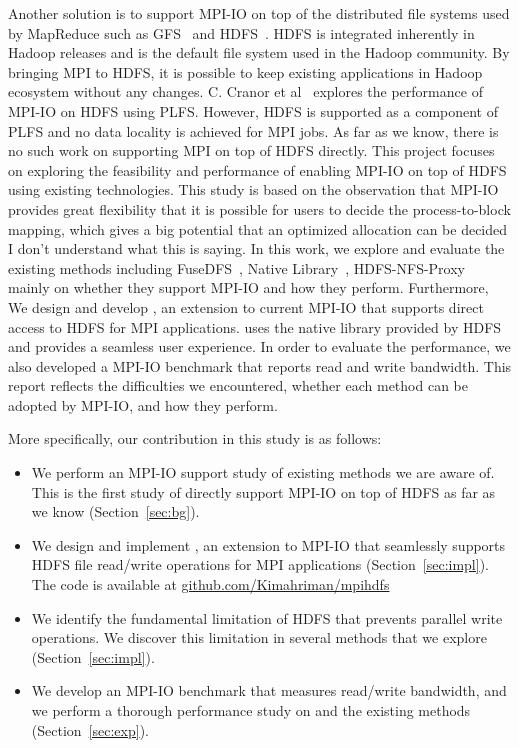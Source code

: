 Another solution is to support MPI-IO on top of the distributed file systems
used by MapReduce such as GFS~\cite{gfs} and HDFS~\cite{hdfs}. HDFS is integrated
inherently in Hadoop releases and is the default file system used in the Hadoop
community. By bringing MPI to HDFS, it is possible to keep existing applications
in Hadoop ecosystem without any changes. C. Cranor et al~\cite{CMU-PDL-12-115} explores the
performance of MPI-IO on HDFS using PLFS. However, HDFS is supported as a
component of PLFS and no data locality is achieved for MPI jobs. As far as we
know, there is no such work on supporting MPI on top of HDFS directly. This
project focuses on exploring the feasibility and performance of enabling MPI-IO
on top of HDFS using existing technologies. This study is based on the
observation that MPI-IO provides great flexibility that it is possible for users
to decide the process-to-block mapping, which gives a big potential that an
optimized allocation can be decided {\color{red} I don't understand what this is saying}. In this work, we explore and evaluate
the existing methods including FuseDFS~\cite{fuse}, Native Library~\cite{lib},
HDFS-NFS-Proxy~\cite{proxy} mainly on whether they support MPI-IO and how
they perform. Furthermore, We design and develop
{\proj}, an extension to current MPI-IO that supports direct access to HDFS for
MPI applications. {\proj} uses the native library provided by HDFS and provides a
seamless user experience. In order to evaluate the performance, we also
developed a MPI-IO benchmark that reports read and write bandwidth. This report
reflects the difficulties we encountered, whether each method can be adopted by
MPI-IO, and how they perform. 

More specifically, our contribution in this study is as follows:
\begin{itemize}
\item We perform an MPI-IO support study of existing methods we are aware of. This
	is the first study of directly support MPI-IO on top of HDFS as far as
	we know (Section~\ref{sec:bg}).
\item We design and implement {\proj}, an extension to MPI-IO that seamlessly
	supports HDFS file read/write operations for MPI applications 
	(Section~\ref{sec:impl}). The code is available at \url{github.com/Kimahriman/mpihdfs}
\item We identify the fundamental limitation of HDFS that prevents parallel
	write operations. We discover this limitation in several methods that we
	explore (Section~\ref{sec:impl}).
\item We develop an MPI-IO benchmark that measures read/write bandwidth, and
	we perform a thorough performance study on {\proj} and the existing
	methods (Section~\ref{sec:exp}).
\end{itemize}

